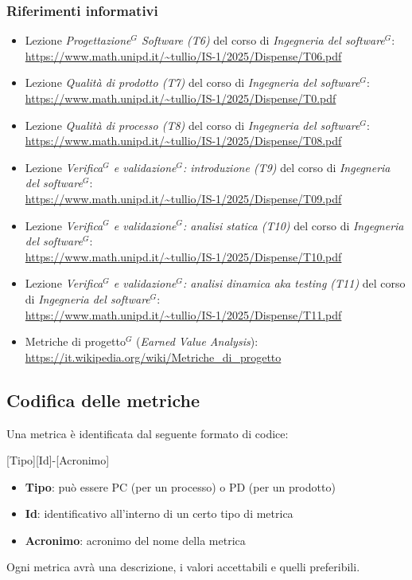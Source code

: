 \documentclass[a4paper,10pt]{article}
\begin{document}
\subsubsection{Riferimenti informativi}
\begin{itemize}
    \item Lezione \textit{Progettazione$^G$ Software (T6)} del corso di \textit{Ingegneria del software$^G$}: \\ \url{https://www.math.unipd.it/~tullio/IS-1/2025/Dispense/T06.pdf}
    \item Lezione \textit{Qualità di prodotto (T7)} del corso di \textit{Ingegneria del software$^G$}: \\ \url{https://www.math.unipd.it/~tullio/IS-1/2025/Dispense/T0.pdf}
    \item Lezione \textit{Qualità di processo (T8)} del corso di \textit{Ingegneria del software$^G$}: \\ \url{https://www.math.unipd.it/~tullio/IS-1/2025/Dispense/T08.pdf}
    \item Lezione \textit{Verifica$^G$ e validazione$^G$: introduzione (T9)} del corso di \textit{Ingegneria del software$^G$}: \\ \url{https://www.math.unipd.it/~tullio/IS-1/2025/Dispense/T09.pdf}
    \item Lezione \textit{Verifica$^G$ e validazione$^G$: analisi statica (T10)} del corso di \textit{Ingegneria del software$^G$}: \\ \url{https://www.math.unipd.it/~tullio/IS-1/2025/Dispense/T10.pdf}
    \item Lezione \textit{Verifica$^G$ e validazione$^G$: analisi dinamica aka testing (T11)} del corso di \textit{Ingegneria del software$^G$}: \\ \url{https://www.math.unipd.it/~tullio/IS-1/2025/Dispense/T11.pdf}
    \item Metriche di progetto$^G$ (\textit{Earned Value Analysis}): \\ \url{https://it.wikipedia.org/wiki/Metriche_di_progetto}
\end{itemize}
\subsection{Codifica delle metriche}
Una metrica è identificata dal seguente formato di codice: 
\begin{center}
    [Tipo][Id]-[Acronimo]
\end{center}
\begin{itemize}
    \item \textbf{Tipo}: può essere PC (per un processo) o PD (per un prodotto)
    \item \textbf{Id}: identificativo all'interno di un certo tipo di metrica
    \item \textbf{Acronimo}: acronimo del nome della metrica
\end{itemize}
Ogni metrica avrà una descrizione, i valori accettabili e quelli preferibili.
\end{document}
